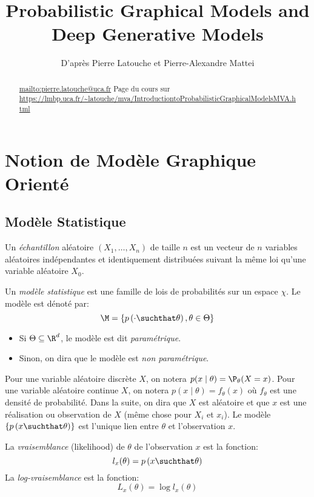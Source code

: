 \documentclass[info, math, french]{mpb-cours}
\title{Probabilistic Graphical Models and Deep Generative Models}
\author{D'après Pierre Latouche et Pierre-Alexandre Mattei}
\def\model#1#2{p\left(#1\suchthat#2\right)}
\def\define#1{\emph{\textcolor{vulm}{#1}}}
\begin{document}
\bettertitle
\begin{abstract}
	\url{mailto:pierre.latouche@uca.fr}
	Page du cours sur \url{https://lmbp.uca.fr/~latouche/mva/IntroductiontoProbabilisticGraphicalModelsMVA.html}
\end{abstract}

\section{Notion de Modèle Graphique Orienté}
\subsection{Modèle Statistique}
\begin{definition}
	Un \define{échantillon} aléatoire $(X_{1}, \ldots, X_{n})$ de taille $n$ est un vecteur de $n$ variables aléatoires indépendantes et identiquement distribuées suivant la même loi qu'une variable aléatoire $X_{0}$.
\end{definition}

\begin{definition}
	Un \define{modèle statistique} est une famille de lois de probabilités sur un espace $\chi$.
	Le modèle est dénoté par:
	\begin{equation*}
		\M = \{\model{\cdot}{\theta}, \theta \in \Theta\}
	\end{equation*}
	\begin{itemize}
		\item Si $\Theta \subseteq \R^{d}$, le modèle est dit \define{paramétrique}.
		\item Sinon, on dira que le modèle est \define{non paramétrique}.
	\end{itemize}
\end{definition}
Pour une variable aléatoire discrète $X$, on notera $p(x \mid \theta) = \P_{\theta}(X = x)$.
Pour une variable aléatoire continue $X$, on notera $p(x \mid \theta) = f_{\theta}(x)$ où $f_{\theta}$ est une densité de probabilité.
Dans la suite, on dira que $X$ est aléatoire et que $x$ est une réalisation ou observation de $X$ (même chose pour $X_{i}$ et $x_{i}$).
Le modèle $\{\model{x}{\theta}\}$ est l'unique lien entre $\theta$ et l'observation $x$.

\begin{definition}
	La \define{vraisemblance} (likelihood) de $\theta$ de l'observation $x$ est la fonction:
	\begin{equation*}
		l_{x}(\theta) = \model{x}{\theta}
	\end{equation*}
	La \define{log-vraisemblance} est la fonction:
	\begin{equation*}
		L_{x}(\theta) = \log l_{x}(\theta)
	\end{equation*}
\end{definition}
\end{document}

